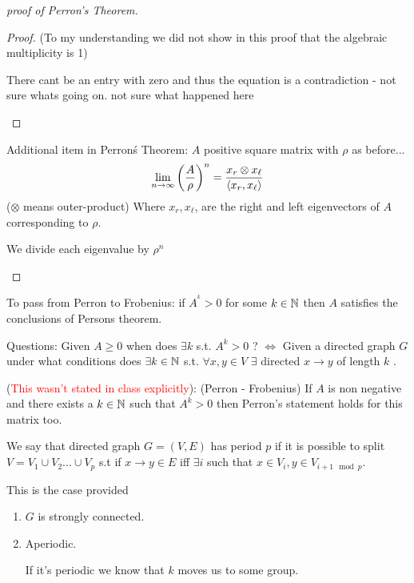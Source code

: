 \begin{proof}[proof of Perron's Theorem]
\begin{claim}
\begin{proof}
(To my understanding we did not show in this proof that the algebraic
multiplicity is 1)%
\begin{insight}
There cant be an entry with zero and thus the equation is a contradiction
- not sure whats going on. not sure what happened here%
\end{insight}

\end{proof}
\end{claim}

 Additional item in Perron\'{s} Theorem: $A$ positive square matrix
with $\rho$ as before...
\[
\lim\limits _{n\to\infty}\left(\frac{A}{\rho}\right)^{n}=\frac{x_{r}\otimes x_{\ell}}{\left\langle x_{r},x_{\ell}\right\rangle }
\]
 ($\otimes$ means outer-product) Where $x_{r},x_{\ell}$, are the
right and left eigenvectors of $A$ corresponding to $\rho$.%
\begin{insight}
We divide each eigenvalue by $\rho^{n}$%
\end{insight}

\end{proof}
%
To pass from Perron to Frobenius: if $A^{^{k}}>0$ for some $k\in\mathbb{N}$
then $A$ satisfies the conclusions of Persons theorem.

Questions: Given $A\ge0$ when does $\exists k$ s.t. $A^{k}>0$ ?
$\iff$ Given a directed graph $G$ under what conditions does $\exists k\in\mathbb{N}$
s.t. $\forall x,y\in V$ $\exists$ directed $x\to y$ of length $k$
.
\begin{thm}
(\textcolor{red}{This wasn't stated in class explicitly}): (Perron
- Frobenius) If $A$ is non negative and there exists a $k\in\mathbb{N}$
such that $A^{k}>0$ then Perron's statement holds for this matrix
too.
\end{thm}

\begin{definition}
We say that directed graph $G=\left(V,E\right)$ has period $p$ if
it is possible to split $V=V_{1}\cup V_{2}\dots\cup V_{p}$ s.t if
$x\to y\in E$ iff $\exists i$ such that $x\in V_{i},y\in V_{i+1\mod p}$.
\end{definition}

\begin{claim}
This is the case provided
\begin{enumerate}
\item $G$ is strongly connected.
\item Aperiodic. %
\begin{insight}
If it's periodic we know that $k$ moves us to some group.%
\end{insight}
\end{enumerate}
\end{claim}


